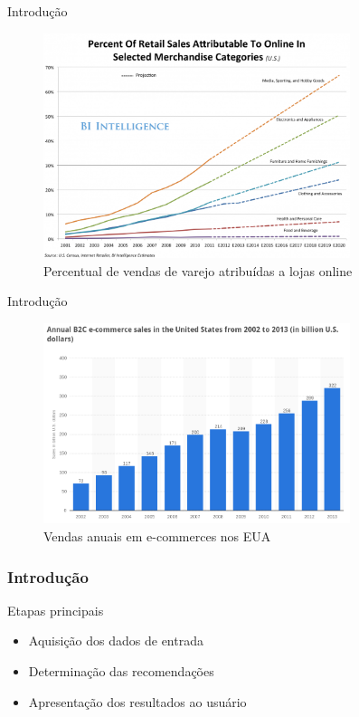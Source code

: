 \begin{frame}{Introdução}
\begin{figure}[ht]
    \begin{center}
    \includegraphics[width=0.8\textwidth]{img/crescimento-ecommerce}\caption{Percentual de vendas de varejo atribuídas a lojas online \cite{crescimento-ecommerce}}
    \end{center}
\end{figure}
\end{frame}

\begin{frame}{Introdução}
\begin{figure}[ht]
    \begin{center}
    \includegraphics[width=0.8\textwidth]{img/sales-ecommerce}\caption{Vendas anuais em e-commerces nos EUA \cite{sales-ecommerce}}
    \end{center}
\end{figure}
\end{frame}

\begin{frame}
\frametitle{Introdução}
\begin{block}{Etapas principais}
\begin{itemize}
	\item Aquisição dos dados de entrada
	\item Determinação das recomendações
	\item Apresentação dos resultados ao usuário
\end{itemize}
\end{block}
\end{frame}

